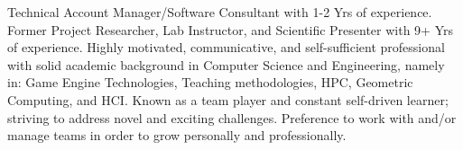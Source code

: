 

\begin{cvsummary}

Technical Account Manager/Software Consultant
with %
1-2 Yrs of experience.
Former Project Researcher, Lab Instructor, and Scientific Presenter with 9+ Yrs of experience.
Highly motivated, communicative, and self-sufficient%
professional with solid academic background in Computer Science and Engineering, namely in: 
Game Engine Technologies, Teaching methodologies, HPC, Geometric Computing, and HCI.
Known as a team player %
and constant self-driven learner; 
striving to address novel and exciting challenges. %
Preference to work with and/or manage teams in order to grow personally and professionally.
\end{cvsummary}
